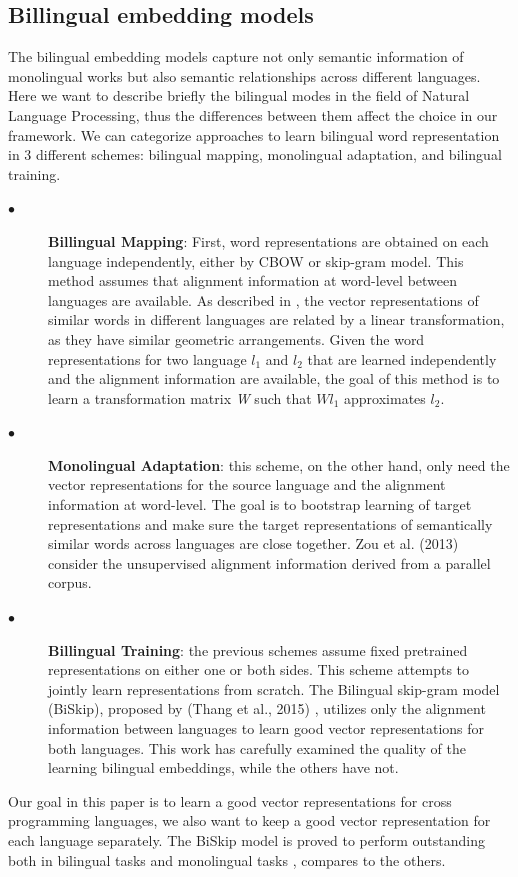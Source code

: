 \subsection{Billingual embedding models}
The bilingual embedding models capture not only semantic information of monolingual works but also semantic relationships across different languages. Here we want to describe briefly the bilingual modes in the field of Natural Language Processing, thus the differences between them affect the choice in our framework. We can categorize approaches to learn bilingual word representation in 3 different schemes: bilingual mapping, monolingual adaptation, and bilingual training.
\begin{description}
	\item [$\bullet$] \textbf{Billingual Mapping}: First, word representations are obtained on each language independently, either by CBOW or skip-gram model. This method assumes that alignment information at word-level between languages are available. As described in \cite{mikolov2013exploiting}, the vector representations of similar words in different languages are related by a linear transformation, as they have similar geometric arrangements. Given the word representations for two language \begin{math}l_{1}\end{math} and \begin{math}l_{2}\end{math} that are learned independently and the alignment information are available, the goal of this method is to learn a transformation matrix \textit{W} such that \begin{math}W l_{1}\end{math} approximates \begin{math}l_{2}\end{math}.
	\item [$\bullet$] \textbf{Monolingual Adaptation}: this scheme, on the other hand, only need the vector representations for the source language and the alignment information at word-level. The goal is to bootstrap learning of target representations and make sure the target representations of semantically similar words across languages are close together. Zou et al. (2013) consider the unsupervised alignment information derived from a parallel corpus.
	\item [$\bullet$] \textbf{Billingual Training}: the previous schemes assume fixed pretrained representations on either one or both sides. This scheme attempts to jointly learn representations from scratch. The Bilingual skip-gram model (BiSkip), proposed by (Thang et al., 2015) \cite{luong2015bilingual}, utilizes only the alignment information between languages to learn good vector representations for both languages. This work has carefully examined the quality of the learning bilingual embeddings, while the others have not.
\end{description}
Our goal in this paper is to learn a good vector representations for cross programming languages, we also want to keep a good vector representation for each language separately. The BiSkip model is proved to perform outstanding both in bilingual tasks and monolingual tasks \cite{luong2015bilingual}, compares to the others.

